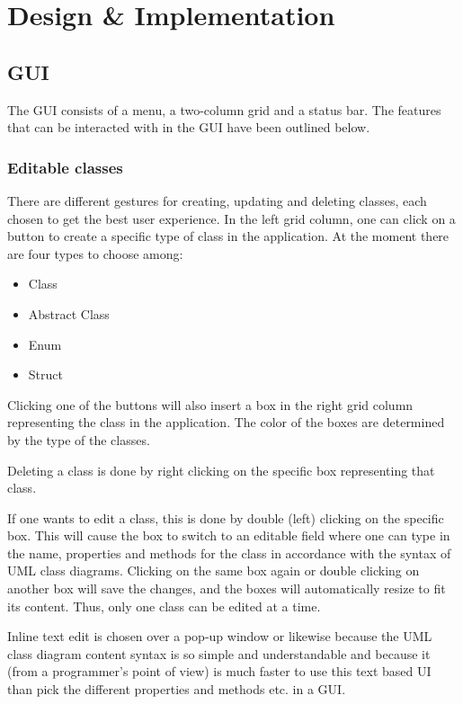 \chapter{Design \& Implementation}
\label{sec:design_and_implementation}

\section{GUI}
\label{sec:gui}

The GUI consists of a menu, a two-column grid and a status bar. The features that can be interacted with in the GUI have been outlined below.

\subsection{Editable classes}

There are different gestures for creating, updating and deleting classes, each chosen to get the best user experience. In the left grid column, one can click on a button to create a specific type of class in the application. At the moment there are four types to choose among:

\begin{itemize}
  \item Class
  \item Abstract Class
  \item Enum
  \item Struct
\end{itemize}

Clicking one of the buttons will also insert a box in the right grid column representing the class in the application. The color of the boxes are determined by the type of the classes.

Deleting a class is done by right clicking on the specific box representing that class.

If one wants to edit a class, this is done by double (left) clicking on the specific box. This will cause the box to switch to an editable field where one can type in the name, properties and methods for the class in accordance with the syntax of UML class diagrams. Clicking on the same box again or double clicking on another box will save the changes, and the boxes will automatically resize to fit its content. Thus, only one class can be edited at a time.

Inline text edit is chosen over a pop-up window or likewise because the UML class diagram content syntax is so simple and understandable and because it (from a programmer's point of view) is much faster to use this text based UI than pick the different properties and methods etc. in a GUI.

